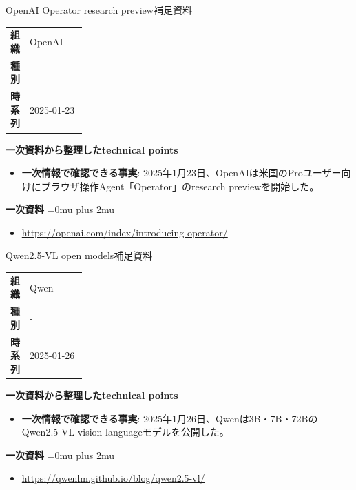 \begin{technicalnote}{OpenAI Operator research preview}{補足資料}
\begingroup
\begin{tabularx}{\linewidth}{@{}>{\bfseries}p{0.22\linewidth}X@{}}
組織 & OpenAI \\
種別 & - \\
時系列 & 2025-01-23 \\
\end{tabularx}
\smallskip
{\bfseries 一次資料から整理したtechnical points}
\begin{itemize}[leftmargin=1.5em,itemsep=0.35em]
\item \textbf{一次情報で確認できる事実}: 2025年1月23日、OpenAIは米国のProユーザー向けにブラウザ操作Agent「Operator」のresearch previewを開始した。
\end{itemize}
\begin{samepage}
{\bfseries 一次資料}
\begingroup\sloppy
\Urlmuskip=0mu plus 2mu\relax
\begin{itemize}[leftmargin=1.5em,itemsep=0.25em]
\item {\scriptsize\url{https://openai.com/index/introducing-operator/}}
\end{itemize}
\endgroup
\end{samepage}
\endgroup
\end{technicalnote}
\medskip

\begin{technicalnote}{Qwen2.5-VL open models}{補足資料}
\begingroup
\begin{tabularx}{\linewidth}{@{}>{\bfseries}p{0.22\linewidth}X@{}}
組織 & Qwen \\
種別 & - \\
時系列 & 2025-01-26 \\
\end{tabularx}
\smallskip
{\bfseries 一次資料から整理したtechnical points}
\begin{itemize}[leftmargin=1.5em,itemsep=0.35em]
\item \textbf{一次情報で確認できる事実}: 2025年1月26日、Qwenは3B・7B・72BのQwen2.5-VL vision-languageモデルを公開した。
\end{itemize}
\begin{samepage}
{\bfseries 一次資料}
\begingroup\sloppy
\Urlmuskip=0mu plus 2mu\relax
\begin{itemize}[leftmargin=1.5em,itemsep=0.25em]
\item {\scriptsize\url{https://qwenlm.github.io/blog/qwen2.5-vl/}}
\end{itemize}
\endgroup
\end{samepage}
\endgroup
\end{technicalnote}
\medskip

